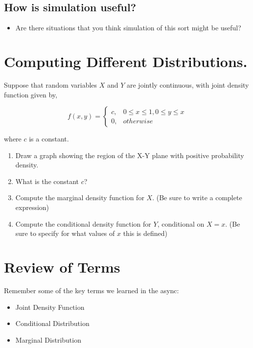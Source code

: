 \documentclass[
]{book}
\providecommand{\tightlist}{%
  \setlength{\itemsep}{0pt}\setlength{\parskip}{0pt}}
\theoremstyle{definition}
\theoremstyle{definition}
\theoremstyle{definition}
\theoremstyle{definition}
\theoremstyle{remark}
\begin{document}
\hypertarget{how-is-simulation-useful}{%
\subsection{How is simulation useful?}\label{how-is-simulation-useful}}

\begin{itemize}
\tightlist
\item
  Are there situations that you think simulation of this sort might be useful?
\end{itemize}

\hypertarget{computing-different-distributions.}{%
\section{Computing Different Distributions.}\label{computing-different-distributions.}}

Suppose that random variables \(X\) and \(Y\) are jointly continuous, with joint density function given by,

\[
f(x,y) = 
  \begin{cases}
    c, & 0 \leq x \leq 1, 0 \leq y \leq x \\
    0, & otherwise
\end{cases}
\]

where \(c\) is a constant.

\begin{enumerate}
\def\labelenumi{\arabic{enumi}.}
\tightlist
\item
  Draw a graph showing the region of the X-Y plane with positive probability density.
\item
  What is the constant \(c\)?
\item
  Compute the marginal density function for \(X\). (Be sure to write a complete expression)
\item
  Compute the conditional density function for \(Y\), conditional on \(X=x\). (Be sure to specify for what values of \(x\) this is defined)
\end{enumerate}

\hypertarget{review-of-terms}{%
\section{Review of Terms}\label{review-of-terms}}

Remember some of the key terms we learned in the async:

\begin{itemize}
\tightlist
\item
  Joint Density Function
\item
  Conditional Distribution
\item
  Marginal Distribution
\end{itemize}
\end{document}
